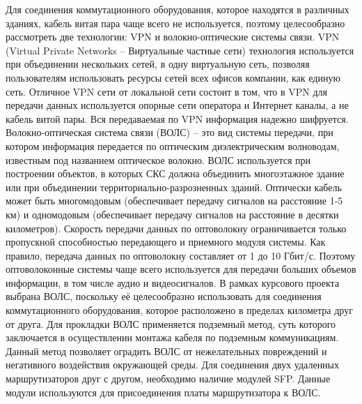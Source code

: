 Для соединения коммутационного оборудования, которое находятся в различных зданиях, кабель витая пара чаще всего не используется, поэтому целесообразно рассмотреть две технологии: VPN и волокно-оптические системы связи.
VPN (Virtual Private Networks – Виртуальные частные сети) технология используется при объединении нескольких сетей, в одну виртуальную сеть, позволяя пользователям использовать ресурсы сетей всех офисов компании, как единую сеть. Отличное VPN сети от локальной сети состоит в том, что в VPN для передачи данных используется опорные сети оператора и Интернет каналы, а не кабель витой пары. Вся передаваемая по VPN информация надежно шифруется. 
Волокно-оптическая система связи (ВОЛС) – это вид системы передачи, при котором информация передается по оптическим диэлектрическим волноводам, известным под названием оптическое волокно. ВОЛС используется при построении объектов, в которых СКС должна объединить многоэтажное здание или при объединении территориально-разрозненных зданий. Оптически кабель может быть многомодовым (обеспечивает передачу сигналов на расстояние 1-5 км) и одномодовым (обеспечивает передачу сигналов на расстояние в десятки километров). Скорость передачи данных по оптоволокну ограничивается только пропускной способностью передающего и приемного модуля системы. Как правило, передача данных по оптоволокну составляет от 1 до 10 Гбит/с. Поэтому оптоволоконные системы чаще всего используется для передачи больших объемов информации, в том числе аудио и видеосигналов.
В рамках курсового проекта выбрана ВОЛС, поскольку её целесообразно использовать для соединения коммутационного оборудования, которое расположено в пределах километра друг от друга. Для прокладки ВОЛС применяется подземный метод, суть которого заключается в осуществлении монтажа кабеля по подземным коммуникациям. Данный метод позволяет оградить ВОЛС от нежелательных повреждений и негативного воздействия окружающей среды.
Для соединения двух удаленных маршрутизаторов друг с другом, необходимо наличие модулей SFP. Данные модули используются для присоединения платы маршрутизатора к ВОЛС.
